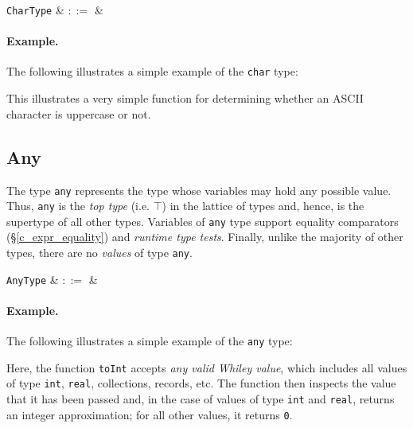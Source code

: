 \begin{syntax}
  \verb+CharType+ & $::=$ &  \\
\end{syntax}

\paragraph{Example.} The following illustrates a simple example of the \lstinline{char} type:



This illustrates a very simple function for determining whether an ASCII character is uppercase or not.


\subsection{Any}
\label{c_types_any}

The type \lstinline{any} represents the type whose variables may hold any possible value.  Thus, \lstinline{any} is the {\em top type} (i.e. $\top$) in the lattice of types and, hence, is the supertype of all other types.  Variables of \lstinline{any} type support equality comparators (\S\ref{c_expr_equality}) and {\em runtime type tests}.  Finally, unlike the majority of other types, there are no {\em values} of type \lstinline{any}.

\begin{syntax}
  \verb+AnyType+ & $::=$ &  \\
\end{syntax}

\paragraph{Example.} The following illustrates a simple example of the \lstinline{any} type:



Here, the function \lstinline{toInt} accepts {\em any valid Whiley value}, which includes all values of type \lstinline{int}, \lstinline{real}, collections, records, etc.  The function then inspects the value that it has been passed and, in the case of values of type \lstinline{int} and \lstinline{real}, returns an integer approximation; for all other values, it returns \lstinline{0}.

